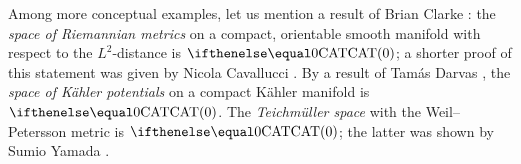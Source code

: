 Among more conceptual examples, let us mention a result of Brian Clarke \cite{clarke}: the \textit{space of Riemannian metrics} on a compact, orientable smooth manifold
with respect to the $L^2$-distance is $\CAT0$;
a shorter proof of this statement was given by Nicola Cavallucci \cite{cavallucci}.
By a result of Tam\'{a}s Darvas \cite{darvas}, the \textit{space of K\"{a}hler potentials} on a compact K\"{a}hler manifold is $\CAT0$.
The \textit{Teichm\"{u}ller space} with the Weil--Petersson metric is $\CAT0$; 
the latter was shown by Sumio Yamada \cite{yamada}.
